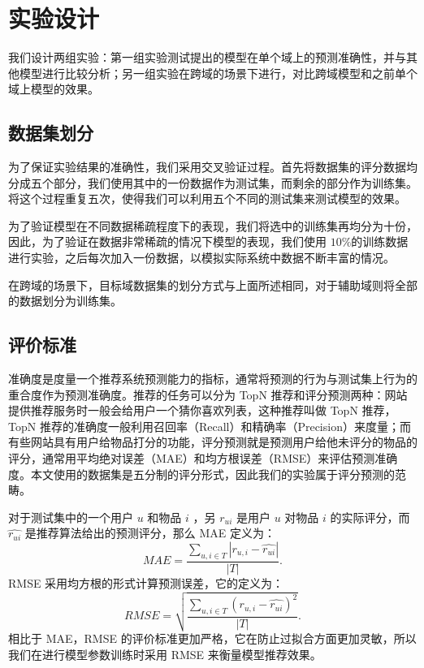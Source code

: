 \section{实验设计}
我们设计两组实验：第一组实验测试提出的模型在单个域上的预测准确性，并与其他模型进行比较分析；另一组实验在跨域的场景下进行，对比跨域模型和之前单个域上模型的效果。
\subsection{数据集划分}
为了保证实验结果的准确性，我们采用交叉验证过程。首先将数据集的评分数据均分成五个部分，我们使用其中的一份数据作为测试集，而剩余的部分作为训练集。将这个过程重复五次，使得我们可以利用五个不同的测试集来测试模型的效果。

为了验证模型在不同数据稀疏程度下的表现，我们将选中的训练集再均分为十份，因此，为了验证在数据非常稀疏的情况下模型的表现，我们使用 $10\%$的训练数据进行实验，之后每次加入一份数据，以模拟实际系统中数据不断丰富的情况。

在跨域的场景下，目标域数据集的划分方式与上面所述相同，对于辅助域则将全部的数据划分为训练集。

\subsection{评价标准}
准确度是度量一个推荐系统预测能力的指标，通常将预测的行为与测试集上行为的重合度作为预测准确度。推荐的任务可以分为 TopN 推荐和评分预测两种：网站提供推荐服务时一般会给用户一个猜你喜欢列表，这种推荐叫做 TopN 推荐，TopN 推荐的准确度一般利用召回率（Recall）和精确率（Precision）来度量；而有些网站具有用户给物品打分的功能，评分预测就是预测用户给他未评分的物品的评分，通常用平均绝对误差（MAE）和均方根误差（RMSE）来评估预测准确度。本文使用的数据集是五分制的评分形式，因此我们的实验属于评分预测的范畴。

对于测试集中的一个用户 $u$ 和物品 $i$ ，另 $r_{ui}$ 是用户 $u$ 对物品  $i$  的实际评分，而 $\hat{r_{ui}}$  是推荐算法给出的预测评分，那么 MAE 定义为：
\begin{equation}
MAE = \dfrac   {\sum\limits_{u,i \in T}  |r_{u,i} - \hat{r_{ui}}| } {|T|}.
\end{equation}
RMSE 采用均方根的形式计算预测误差，它的定义为：
\begin{equation}
RMSE = \sqrt{  \dfrac   {\sum\limits_{u,i \in T}  (r_{u,i} - \hat{r_{ui}}) ^2 } {|T|}   }.
\end{equation}
相比于 MAE，RMSE 的评价标准更加严格，它在防止过拟合方面更加灵敏，所以我们在进行模型参数训练时采用 RMSE 来衡量模型推荐效果。

